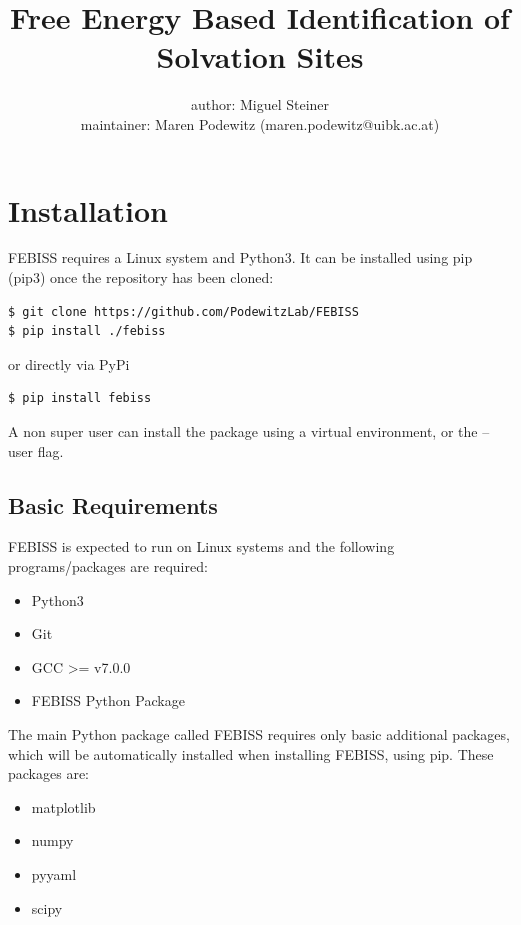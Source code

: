 \documentclass[12pt]{scrartcl} %
\title{Free Energy Based Identification of Solvation Sites}
\subtitle{}
\author{author: Miguel Steiner\\maintainer: Maren Podewitz (maren.podewitz@uibk.ac.at)}
\date{}
\begin{document}
\maketitle
\newpage


\newpage
\section{Installation}

FEBISS requires a Linux system and Python3. It can be installed using pip (pip3) once the repository has been cloned:
\begin{lstlisting}[language=bash]
$ git clone https://github.com/PodewitzLab/FEBISS
$ pip install ./febiss
\end{lstlisting}
or directly via PyPi
\begin{lstlisting}[language=bash]
$ pip install febiss
\end{lstlisting}
A non super user can install the package using a virtual environment, or the --user flag.

\subsection{Basic Requirements}
FEBISS is expected to run on Linux systems and the following programs/packages are required:
\begin{itemize}
\item Python3
\item Git
\item GCC >= v7.0.0
\item FEBISS Python Package
\end{itemize}
The main Python package called FEBISS requires only basic additional packages, which will be automatically installed when installing FEBISS, using pip. These packages are:
\begin{itemize}
	\item matplotlib
	\item numpy
	\item pyyaml
	\item scipy
\end{itemize}
\end{document}
